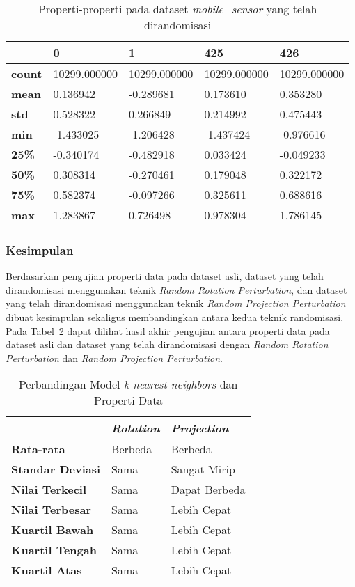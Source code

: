 \begin{table}
	\centering
	\caption{Properti-properti pada dataset \textit{mobile\_sensor} yang telah dirandomisasi}
	\begin{tabular}{l|llll}
		\hline
		& 0 & 1 & 425 & 426 \\ \hline
		\textbf{count} & 10299.000000 & 10299.000000 & 10299.000000 & 10299.000000 \\
		\textbf{mean} & 0.136942 & -0.289681 & 0.173610 & 0.353280 \\
		\textbf{std} & 0.528322 & 0.266849 & 0.214992 & 0.475443 \\
		\textbf{min} & -1.433025 & -1.206428 & -1.437424 & -0.976616 \\
		\textbf{25\%} & -0.340174 & -0.482918 & 0.033424 & -0.049233 \\
		\textbf{50\%} & 0.308314 & -0.270461 & 0.179048 & 0.322172 \\
		\textbf{75\%} & 0.582374 & -0.097266 & 0.325611 & 0.688616 \\
		\textbf{max} & 1.283867 & 0.726498 & 0.978304 & 1.786145 \\
		\hline
	\end{tabular}
	\label{table:properti-mobile-sensor-asli}
\end{table}

\subsubsection{Kesimpulan}
\label{subsubsec:pengujian-properti-kesimpulan}

Berdasarkan pengujian properti data pada dataset asli, dataset yang telah dirandomisasi menggunakan teknik \textit{Random Rotation Perturbation}, dan dataset yang telah dirandomisasi menggunakan teknik \textit{Random Projection Perturbation} dibuat kesimpulan sekaligus membandingkan antara kedua teknik randomisasi. Pada Tabel~\ref{table:perbandingan-properti} dapat dilihat hasil akhir pengujian antara properti data pada dataset asli dan dataset yang telah dirandomisasi dengan \textit{Random Rotation Perturbation} dan \textit{Random Projection Perturbation}.

\begin{table}
	\centering
	\caption{Perbandingan Model \textit{k-nearest neighbors} dan Properti Data}
	\begin{tabular}{|l|l|l|}
		\hline
		& \textbf{\textit{Rotation}} & \textbf{\textit{Projection}} \\ \hline
		\textbf{Rata-rata} & Berbeda & Berbeda \\
		\textbf{Standar Deviasi} & Sama & Sangat Mirip \\
		\textbf{Nilai Terkecil} & Sama & Dapat Berbeda \\
		\textbf{Nilai Terbesar} & Sama & Lebih Cepat \\
		\textbf{Kuartil Bawah} & Sama & Lebih Cepat \\
		\textbf{Kuartil Tengah} & Sama & Lebih Cepat \\
		\textbf{Kuartil Atas} & Sama & Lebih Cepat \\
		\hline
	\end{tabular}
	\label{table:perbandingan-properti}
\end{table}

